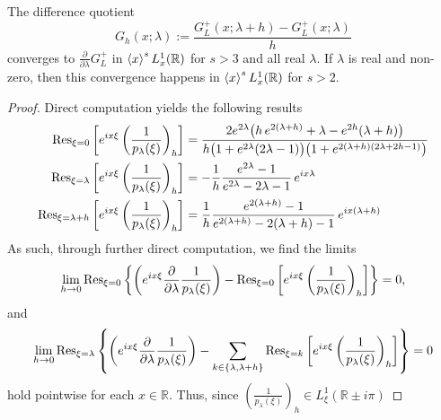 \documentclass[../dissertation]{subfiles}
\begin{document}
\begin{prop}\label{prop2:ghconv}
	The difference quotient
	\[
		G_h(x; \lambda) := \frac{G_L^+(x; \lambda+h) - G_L^+(x; \lambda)}{h}
	\]
	converges to $\frac{\partial}{\partial \lambda} G_L^+$ in 
	$\left\langle x \right\rangle^s L_x^1(\mathbb R)$ for $s > 3$ and all real $\lambda$. 
	If $\lambda$ is real and non-zero, then 
	this convergence happens in $\left\langle x \right\rangle^s L_x^1(\mathbb R)$ for 
	$s > 2$.
\end{prop}
\begin{proof}
	Direct computation yields the following results
	\begin{align*}
		\operatorname{Res}_{\xi=0}
				\left[
					e^{ix\xi}
					\left(
						\frac{1}{p_\lambda(\xi)}
					\right)_h
				\right]
			&= 
				\frac{
					2 e^{2\lambda}
					\big(
						h \, e^{2(\lambda+h)} 
						+ \lambda 
						- e^{2h}(\lambda + h)
					\big)
				}{
					h 
					\big(
						1 + e^{2\lambda}(2\lambda - 1)
					\big)
					\big(
						1 + e^{2(\lambda+h)(2\lambda + 2h - 1)}
					\big)
				} \\
		\operatorname{Res}_{\xi=\lambda}
				\left[
					e^{ix\xi}
					\left(
						\frac{1}{p_\lambda(\xi)}
					\right)_h
				\right]
			&= - \frac{1}{h}\frac{e^{2\lambda}-1}{e^{2\lambda}-2\lambda-1}
				\, e^{ix\lambda} \\
		\operatorname{Res}_{\xi=\lambda+h}
				\left[
					e^{ix\xi}
					\left(
						\frac{1}{p_\lambda(\xi)}
					\right)_h
				\right]
			&= 
				 \frac{1}{h}
				 \frac{e^{2(\lambda+h)}-1}{e^{2(\lambda+h)}-2(\lambda+h)-1}
				\, e^{ix(\lambda+h)}
	\end{align*}
	As such, through further direct computation, we find the
	limits
	\begin{align*}
		\lim_{h\to0}
			\operatorname{Res}_{\xi=0}
				\left\{ 
				\left(
					e^{ix\xi}
					\frac{\partial}{\partial \lambda}
						\frac{1}{p_\lambda(\xi)}
				\right)
				-
				\operatorname{Res}_{\xi=0}
				\left[
					e^{ix\xi}
					\left(
						\frac{1}{p_\lambda(\xi)}
					\right)_h
				\right]
				\right\}
			=0,
	\end{align*}
	and
	\begin{align*}
		\lim_{h\to0}
			\operatorname{Res}_{\xi=\lambda}
				\left\{ 
				\left(
					e^{ix\xi}
					\frac{\partial}{\partial \lambda}
						\frac{1}{p_\lambda(\xi)}
				\right)
				-
				\sum_{k \in \{\lambda, \lambda+h\}}
				\operatorname{Res}_{\xi=k}
				\left[
					e^{ix\xi}
					\left(
						\frac{1}{p_\lambda(\xi)}
					\right)_h
				\right]
				\right\}
			=0
	\end{align*}
	hold pointwise for each $x \in \mathbb R$. Thus, since
	$\left(\frac{1}{p_\lambda(\xi)}\right)_h \in L_\xi^1(\mathbb R \pm i\pi)$

\end{proof}
\end{document}
